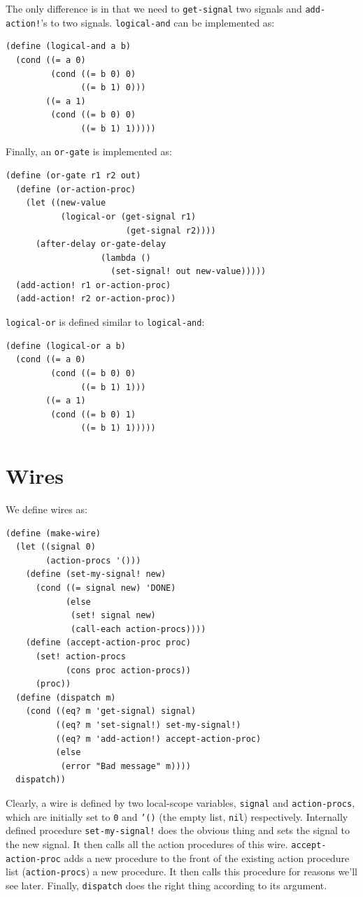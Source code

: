 \documentclass[9pt]{report}
\begin{document}
The only difference is in that we need to \texttt{get-signal} two signals
and \texttt{add-action!}'s to two signals. \texttt{logical-and} can be
implemented as:

\begin{verbatim}
(define (logical-and a b)
  (cond ((= a 0)
         (cond ((= b 0) 0)
               ((= b 1) 0)))
        ((= a 1)
         (cond ((= b 0) 0)
               ((= b 1) 1)))))
\end{verbatim}

Finally, an \texttt{or-gate} is implemented as:

\begin{verbatim}
(define (or-gate r1 r2 out)
  (define (or-action-proc)
    (let ((new-value
           (logical-or (get-signal r1)
                        (get-signal r2))))
      (after-delay or-gate-delay
                   (lambda ()
                     (set-signal! out new-value)))))
  (add-action! r1 or-action-proc)
  (add-action! r2 or-action-proc))
\end{verbatim}

\texttt{logical-or} is defined similar to \texttt{logical-and}:

\begin{verbatim}
(define (logical-or a b)
  (cond ((= a 0)
         (cond ((= b 0) 0)
               ((= b 1) 1)))
        ((= a 1)
         (cond ((= b 0) 1)
               ((= b 1) 1)))))
\end{verbatim}

\section{Wires}
\label{sec:orgcdecc99}

We define wires as:

\begin{verbatim}
(define (make-wire)
  (let ((signal 0)
        (action-procs '()))
    (define (set-my-signal! new)
      (cond ((= signal new) 'DONE)
            (else
             (set! signal new)
             (call-each action-procs))))
    (define (accept-action-proc proc)
      (set! action-procs
            (cons proc action-procs))
      (proc))
  (define (dispatch m)
    (cond ((eq? m 'get-signal) signal)
          ((eq? m 'set-signal!) set-my-signal!)
          ((eq? m 'add-action!) accept-action-proc)
          (else
           (error "Bad message" m))))
  dispatch))
\end{verbatim}

Clearly, a wire is defined by two local-scope variables, \texttt{signal}
and \texttt{action-procs}, which are initially set to \texttt{0} and \texttt{'()} (the
empty list, \texttt{nil}) respectively. Internally defined procedure
\texttt{set-my-signal!} does the obvious thing and sets the signal to the
new signal. It then calls all the action procedures of this wire.
\texttt{accept-action-proc} adds a new procedure to the front of the
existing action procedure list (\texttt{action-procs}) a new procedure.
It then calls this procedure for reasons we'll see later. Finally,
\texttt{dispatch} does the right thing according to its argument.
\end{document}
